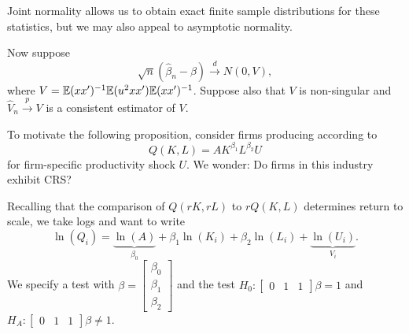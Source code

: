 \begin{remark}	Joint normality allows us to obtain exact finite sample distributions for these statistics, but we may also appeal to asymptotic normality.
	
	Now suppose \[
		\sqrt{n}(\hat{\beta}_n - \beta) \xrightarrow{d} N(0, V)
	,\] where $V = \mathbb{E}(xx')^{-1} \mathbb{E}(u^2 xx') \mathbb{E}(xx')^{-1}$. Suppose also that $V$ is non-singular and $\hat{V}_n \xrightarrow{p} V$ is a consistent estimator of $V$.
\end{remark}
\begin{example}
	To motivate the following proposition, consider firms producing according to \[
		Q(K,L) = A K^{\beta_1}L^{\beta_2} U
	\] for firm-specific productivity shock $U$. We wonder: Do firms in this industry exhibit CRS?

	Recalling that the comparison of $Q(rK,rL)$ to $rQ(K,L)$ determines return to scale, we take logs and want to write \[
		\ln{\left(Q_i\right)} = \underbrace{\ln{\left(A\right)}}_{\beta_0} + \beta_1 \ln{\left(K_i\right)} + \beta_2 \ln{\left(L_i\right)} + \underbrace{\ln{\left(U_i\right)}}_{V_i}
	.\] We specify a test with $\beta = \begin{bmatrix}
	\beta_0  \\
	\beta_1 \\ \beta_2
	\end{bmatrix}$ and the test $H_0: \begin{bmatrix}
	0 & 1 & 1
	\end{bmatrix} \beta = 1$ and $H_A: \begin{bmatrix}
	0 & 1 & 1
	\end{bmatrix}  \beta \ne 1$.
\end{example}

